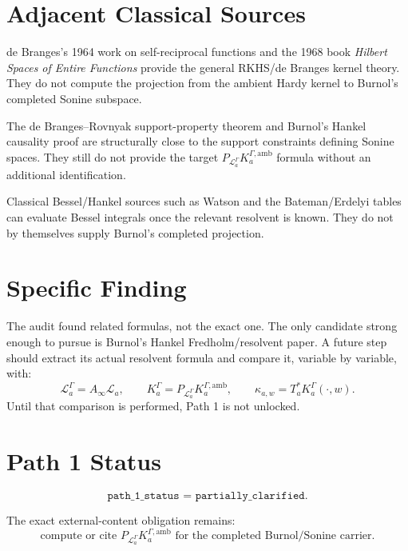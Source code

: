 \documentclass[11pt]{article}
\newcommand{\LaG}{\mathcal L_a^\Gamma}
\newcommand{\Kamb}{K_a^{\Gamma,\mathrm{amb}}}
\newcommand{\KG}{K_a^\Gamma}
\newcommand{\PL}{P_{\mathcal L_a^\Gamma}}
\newcommand{\kappaaw}{\kappa_{a,w}}
\begin{document}
\section*{Adjacent Classical Sources}

de Branges's 1964 work on self-reciprocal functions and the 1968 book \emph{Hilbert Spaces of Entire Functions} provide the general RKHS/de Branges kernel theory.  They do not compute the projection from the ambient Hardy kernel to Burnol's completed Sonine subspace.

The de Branges--Rovnyak support-property theorem and Burnol's Hankel causality proof are structurally close to the support constraints defining Sonine spaces.  They still do not provide the target \(\PL\Kamb\) formula without an additional identification.

Classical Bessel/Hankel sources such as Watson and the Bateman/Erdelyi tables can evaluate Bessel integrals once the relevant resolvent is known.  They do not by themselves supply Burnol's completed projection.

\section*{Specific Finding}

The audit found related formulas, not the exact one.  The only candidate strong enough to pursue is Burnol's Hankel Fredholm/resolvent paper.  A future step should extract its actual resolvent formula and compare it, variable by variable, with:
\[
\LaG=A_\infty\mathcal L_a,\qquad
\KG=\PL\Kamb,\qquad
\kappaaw=T_a^*\KG(\cdot,w).
\]
Until that comparison is performed, Path 1 is not unlocked.

\section*{Path 1 Status}

\[
\boxed{\texttt{path\_1\_status = partially\_clarified}.}
\]

The exact external-content obligation remains:
\[
\text{compute or cite }\PL\Kamb
\text{ for the completed Burnol/Sonine carrier}.
\]
\end{document}
